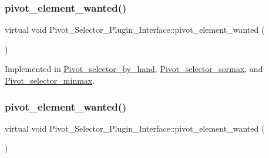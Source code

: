 \subsubsection{\texorpdfstring{pivot\+\_\+element\+\_\+wanted()}{pivot\_element\_wanted()}\hspace{0.1cm}{\footnotesize\ttfamily [3/4]}}
{\footnotesize\ttfamily virtual void Pivot\+\_\+\+Selector\+\_\+\+Plugin\+\_\+\+Interface\+::pivot\+\_\+element\+\_\+wanted (\begin{DoxyParamCaption}\item[{Q\+Standard\+Item\+Model $\ast$}]{ }\end{DoxyParamCaption})\hspace{0.3cm}{\ttfamily [pure virtual]}}



Implemented in \hyperlink{classPivot__selector__by__hand_adbb9dac36bf6cc6807433c617c19ad32}{Pivot\+\_\+selector\+\_\+by\+\_\+hand}, \hyperlink{classPivot__selector__sormax_acfb3f057c0d2dd29b33ef23d547dfe36}{Pivot\+\_\+selector\+\_\+sormax}, and \hyperlink{classPivot__selector__minmax_ae47a96737d527fa40d1ee6608caf9bf3}{Pivot\+\_\+selector\+\_\+minmax}.

\mbox{\label{classPivot__Selector__Plugin__Interface_a79edca6930746a137a95a26239f7af5e}} 
\subsubsection{\texorpdfstring{pivot\+\_\+element\+\_\+wanted()}{pivot\_element\_wanted()}\hspace{0.1cm}{\footnotesize\ttfamily [4/4]}}
{\footnotesize\ttfamily virtual void Pivot\+\_\+\+Selector\+\_\+\+Plugin\+\_\+\+Interface\+::pivot\+\_\+element\+\_\+wanted (\begin{DoxyParamCaption}\item[{Q\+Standard\+Item\+Model $\ast$}]{ }\end{DoxyParamCaption})\hspace{0.3cm}{\ttfamily [pure virtual]}}



